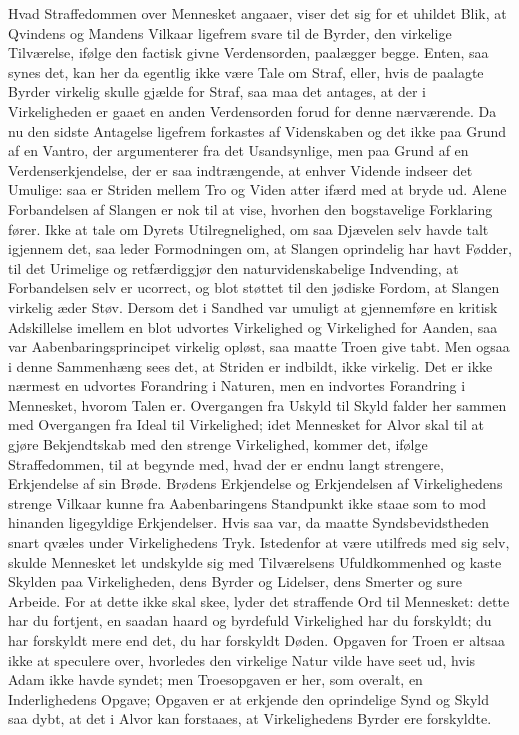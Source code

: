 \documentclass[12pt]{book}
\begin{document}
Hvad Straffedommen over Mennesket angaaer, viser det sig for et
uhildet Blik, at Qvindens og Mandens Vilkaar ligefrem svare til de
Byrder, den virkelige Tilværelse, ifølge den factisk givne
Verdensorden, paalægger begge. Enten, saa synes det, kan her da
egentlig ikke være Tale om Straf, eller, hvis de paalagte Byrder
virkelig skulle gjælde for Straf, saa maa det antages, at der i
Virkeligheden er gaaet en anden Verdensorden forud for denne
nærværende. Da nu den sidste Antagelse ligefrem forkastes af
Videnskaben og det ikke paa Grund af en Vantro, der argumenterer fra
det Usandsynlige, men paa Grund af en Verdenserkjendelse, der er saa
indtrængende, at enhver Vidende indseer det Umulige: saa er Striden
mellem Tro og Viden atter ifærd med at bryde ud. Alene Forbandelsen
af Slangen er nok til at vise, hvorhen den bogstavelige Forklaring
fører. Ikke at tale om Dyrets Utilregnelighed, om saa Djævelen selv
havde talt igjennem det, saa leder Formodningen om, at Slangen
oprindelig har havt Fødder, til det Urimelige og retfærdiggjør den
naturvidenskabelige Indvending, at Forbandelsen selv er ucorrect, og
blot støttet til den jødiske Fordom, at Slangen virkelig æder Støv.
Dersom det i Sandhed var umuligt at gjennemføre en kritisk
Adskillelse imellem en blot udvortes Virkelighed og Virkelighed for
Aanden, saa var Aabenbaringsprincipet virkelig opløst, saa maatte
Troen give tabt. Men ogsaa i denne Sammenhæng sees det, at Striden
er indbildt, ikke virkelig.
Det er ikke nærmest en udvortes Forandring i Naturen, men en
indvortes Forandring i Mennesket, hvorom Talen er. Overgangen fra
Uskyld til Skyld falder her sammen med Overgangen fra Ideal til
Virkelighed; idet Mennesket for Alvor skal til at gjøre Bekjendtskab
med den strenge Virkelighed, kommer det, ifølge Straffedommen, til
at begynde med, hvad der er endnu langt strengere, Erkjendelse af
sin Brøde. Brødens Erkjendelse og Erkjendelsen af Virkelighedens
strenge Vilkaar kunne fra Aabenbaringens Standpunkt ikke staae som
to mod hinanden ligegyldige Erkjendelser. Hvis saa var, da maatte
Syndsbevidstheden snart qvæles under Virkelighedens Tryk.
Istedenfor at være utilfreds med sig selv, skulde Mennesket let
undskylde sig med Tilværelsens Ufuldkommenhed og kaste Skylden paa
Virkeligheden, dens Byrder og Lidelser, dens Smerter og sure
Arbeide. For at dette ikke skal skee, lyder det straffende Ord til
Mennesket: dette har du fortjent, en saadan haard og byrdefuld
Virkelighed har du forskyldt; du har forskyldt mere end det, du har
forskyldt Døden. Opgaven for Troen er altsaa ikke at speculere over,
hvorledes den virkelige Natur vilde have seet ud, hvis Adam ikke
havde syndet; men Troesopgaven er her, som overalt, en
Inderlighedens Opgave; Opgaven er at erkjende den oprindelige Synd
og Skyld saa dybt, at det i Alvor kan forstaaes, at Virkelighedens
Byrder ere forskyldte.
\end{document}
